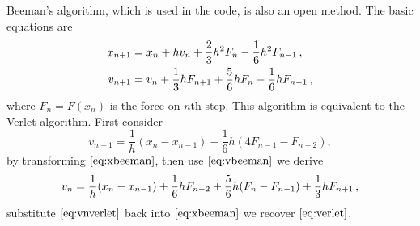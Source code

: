 Beeman's algorithm, which is used in the code, is also an open method.
The basic equations are
\begin{subequations}
	\begin{align}
		x_{n+1} & = x_n + h v_n + \frac{ 2 }{ 3 } h^2 F_n - \frac{ 1 }{ 6 } h^2 F_{n-1} \thinspace,
		\label{eq:xbeeman}\\
		v_{n+1} & = v_n + \frac{ 1 }{ 3 }h F_{n+1} + \frac{ 5 }{ 6 } h F_n - \frac{ 1 }{ 6 } h F_{n-1}
		\thinspace,
		\label{eq:vbeeman}
	\end{align}
\end{subequations}
where $F_n = F(x_n)$ is the force on $n$th step.\cite{dufty1986molecular} This algorithm
is equivalent to the Verlet algorithm. First consider
\begin{equation}
	v_{n-1} = \frac{ 1 }{ h }(x_n - x_{n-1}) - \frac{ 1 }{ 6 } h (4 F_{n-1} - F_{n-2}),
\end{equation}
by transforming $\eqref{eq:xbeeman}$, then use $\eqref{eq:vbeeman}$ we derive
\begin{equation}\label{eq:vnverlet}
	v_n = \frac{ 1 }{ h }(x_n - x_{n-1}) + \frac{ 1 }{ 6 } h F_{n-2} + \frac{ 5 }{ 6 } h (F_n - F_{n-1})
	+ \frac{ 1 }{ 3 }h F_{n+1} \thinspace,
\end{equation}
substitute $\eqref{eq:vnverlet}$ back into $\eqref{eq:xbeeman}$ we recover $\eqref{eq:verlet}$.
